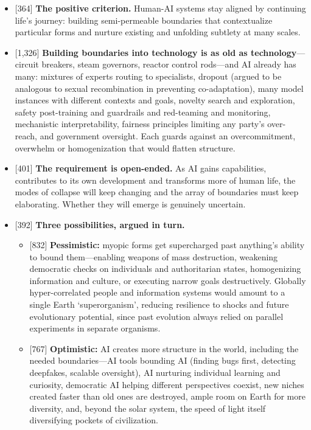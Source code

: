 \documentclass[11pt]{article}
\newcommand{\ct}[1]{{\footnotesize\color{black!55}[#1]}\hspace{1pt}}
\begin{document}
\begin{itemize}
  \item \ct{364} \textbf{The positive criterion.} Human-AI systems stay aligned by continuing life's journey: building semi-permeable boundaries that contextualize particular forms and nurture existing and unfolding subtlety at many scales.
  \item \ct{1,326} \textbf{Building boundaries into technology is as old as technology}---circuit breakers, steam governors, reactor control rods---and AI already has many: mixtures of experts routing to specialists, dropout (argued to be analogous to sexual recombination in preventing co-adaptation), many model instances with different contexts and goals, novelty search and exploration, safety post-training and guardrails and red-teaming and monitoring, mechanistic interpretability, fairness principles limiting any party's over-reach, and government oversight. Each guards against an overcommitment, overwhelm or homogenization that would flatten structure.
  \item \ct{401} \textbf{The requirement is open-ended.} As AI gains capabilities, contributes to its own development and transforms more of human life, the modes of collapse will keep changing and the array of boundaries must keep elaborating. Whether they will emerge is genuinely uncertain.
  \item \ct{392} \textbf{Three possibilities, argued in turn.}
  \begin{itemize}
    \item \ct{832} \textbf{Pessimistic:} myopic forms get supercharged past anything's ability to bound them---enabling weapons of mass destruction, weakening democratic checks on individuals and authoritarian states, homogenizing information and culture, or executing narrow goals destructively. Globally hyper-correlated people and information systems would amount to a single Earth `superorganism', reducing resilience to shocks and future evolutionary potential, since past evolution always relied on parallel experiments in separate organisms.
    \item \ct{767} \textbf{Optimistic:} AI creates more structure in the world, including the needed boundaries---AI tools bounding AI (finding bugs first, detecting deepfakes, scalable oversight), AI nurturing individual learning and curiosity, democratic AI helping different perspectives coexist, new niches created faster than old ones are destroyed, ample room on Earth for more diversity, and, beyond the solar system, the speed of light itself diversifying pockets of civilization.

\end{itemize}
\end{itemize}
\end{document}
